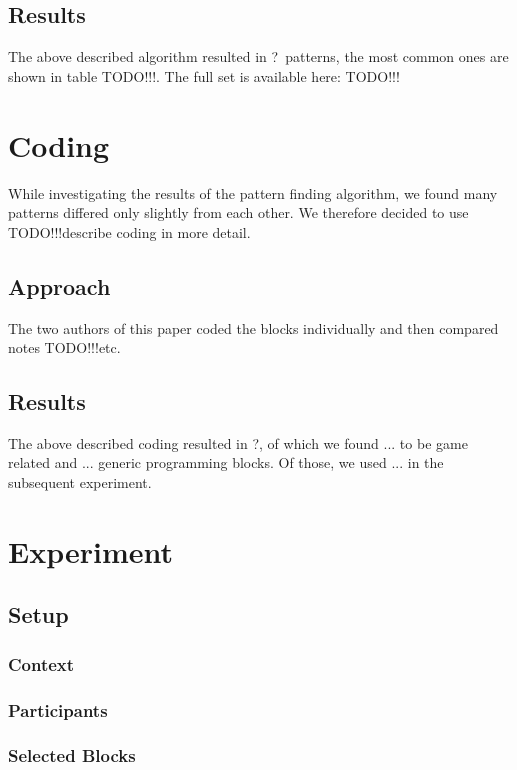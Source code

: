 \documentclass[preprint]{sigplanconf}
\newcommand{\nPatternsInitial}{?}
\newcommand{\nPatternsCoded}{?}
\newcommand{\todo}{TODO!!!}
\begin{document}
\subsection{Results}

The above described algorithm resulted in \nPatternsInitial~patterns, the most common ones are shown in table \todo. The full set is available here: \todo

\section{Coding}
\label{sec:coding}
While investigating the results of the pattern finding algorithm, we found many patterns differed only slightly from each other. We therefore decided to use \todo describe coding in more detail. 

\subsection{Approach}
The two authors of this paper coded the blocks individually and then compared notes \todo etc.

\subsection{Results}
The above described coding resulted in \nPatternsCoded, of which we found ... to be game related and ... generic programming blocks. Of those, we used ... in the subsequent experiment.

\section{Experiment}
\label{sec:experiment}

\subsection{Setup}
\subsubsection{Context}

\subsubsection{Participants}

\subsubsection{Selected Blocks}
\end{document}

